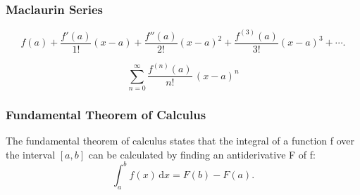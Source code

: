 \documentclass{beamer}
\begin{document}
\begin{frame}
\frametitle{Maclaurin Series}
\[f(a)+\frac {f'(a)}{1!} (x-a)+ \frac{f''(a)}{2!} (x-a)^2+\frac{f^{(3)}(a)}{3!}(x-a)^3+ \cdots.\]
		
\[\sum_{n=0} ^ {\infty } \frac {f^{(n)}(a)}{n!} \, (x-a)^{n}\]
\end{frame}
\begin{frame}
		\frametitle{Fundamental Theorem of Calculus}
		The fundamental theorem of calculus states that the integral of a function f over the interval $[a, b]$ can be calculated by finding an antiderivative F of f:
		\[\int_a^b f(x)\,\mathrm dx = F(b) - F(a).\]
		
	\end{frame}	
		
\end{document}
